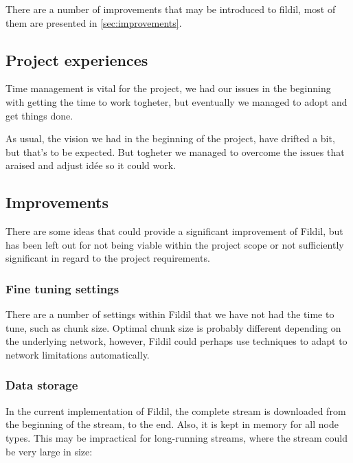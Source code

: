 \documentclass[10pt, a4paper]{article}
\begin{document}
There are a number of improvements that may be introduced to fildil, most of
them are presented in \autoref{sec:improvements}.

\subsection{Project experiences}

Time management is vital for the project, we had our issues in the beginning
with getting the time to work togheter, but eventually we managed to adopt and
get things done.

As usual, the vision we had in the beginning of the project, have drifted a
bit, but that's to be expected. But togheter we managed to overcome the issues
that araised and adjust idée so it could work.

\subsection{Improvements}
\label{sec:improvements}

There are some ideas that could provide a significant improvement of Fildil, but
has been left out for not being viable within the project scope or not
sufficiently significant in regard to the project requirements.

\subsubsection{Fine tuning settings}

There are a number of settings within Fildil that we have not had the time to
tune, such as chunk size. Optimal chunk size is probably different depending on
the underlying network, however, Fildil could perhaps use techniques to adapt to
network limitations automatically.

\subsubsection{Data storage}
\label{sec:storage-improvements}

In the current implementation of Fildil, the complete stream is downloaded from
the beginning of the stream, to the end. Also, it is kept in memory for all node
types. This may be impractical for long-running streams, where the stream could
be very large in size:
\end{document}
